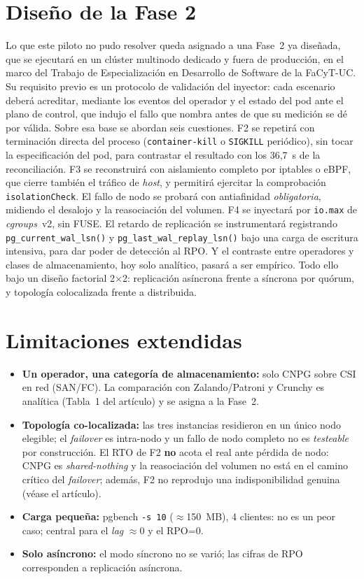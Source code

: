 \documentclass[11pt,letterpaper]{article}
\begin{document}
\section{Diseño de la Fase 2}
Lo que este piloto no pudo resolver queda asignado a una Fase~2 ya diseñada, que se ejecutará en un clúster multinodo dedicado y fuera de producción, en el marco del Trabajo de Especialización en Desarrollo de Software de la FaCyT-UC. Su requisito previo es un protocolo de validación del inyector: cada escenario deberá acreditar, mediante los eventos del operador y el estado del pod ante el plano de control, que indujo el fallo que nombra antes de que su medición se dé por válida. Sobre esa base se abordan seis cuestiones. F2 se repetirá con terminación directa del proceso (\texttt{container-kill} o \texttt{SIGKILL} periódico), sin tocar la especificación del pod, para contrastar el resultado con los 36,7~s de la reconciliación. F3 se reconstruirá con aislamiento completo por iptables o eBPF, que cierre también el tráfico de \textit{host}, y permitirá ejercitar la comprobación \texttt{isolationCheck}. El fallo de nodo se probará con antiafinidad \emph{obligatoria}, midiendo el desalojo y la reasociación del volumen. F4 se inyectará por \texttt{io.max} de \textit{cgroups}~v2, sin FUSE. El retardo de replicación se instrumentará registrando \texttt{pg\_current\_wal\_lsn()} y \texttt{pg\_last\_wal\_replay\_lsn()} bajo una carga de escritura intensiva, para dar poder de detección al RPO. Y el contraste entre operadores y clases de almacenamiento, hoy solo analítico, pasará a ser empírico. Todo ello bajo un diseño factorial 2$\times$2: replicación asíncrona frente a síncrona por quórum, y topología colocalizada frente a distribuida.

\section{Limitaciones extendidas}
\begin{itemize}[leftmargin=1.2em,itemsep=2pt,topsep=2pt]
\item \textbf{Un operador, una categoría de almacenamiento:} solo CNPG sobre CSI en red (SAN/FC). La comparación con Zalando/Patroni y Crunchy es analítica (Tabla~1 del artículo) y se asigna a la Fase~2.
\item \textbf{Topología co-localizada:} las tres instancias residieron en un único nodo elegible; el \emph{failover} es intra-nodo y un fallo de nodo completo no es \emph{testeable} por construcción. El RTO de F2 \textbf{no} acota el real ante pérdida de nodo: CNPG es \emph{shared-nothing} y la reasociación del volumen no está en el camino crítico del \emph{failover}; además, F2 no reprodujo una indisponibilidad genuina (véase el artículo).
\item \textbf{Carga pequeña:} pgbench \texttt{-s 10} ($\approx$150~MB), 4 clientes: no es un peor caso; central para el \emph{lag} $\approx 0$ y el RPO=0.
\item \textbf{Solo asíncrono:} el modo síncrono no se varió; las cifras de RPO corresponden a replicación asíncrona.
\end{itemize}
\end{document}
